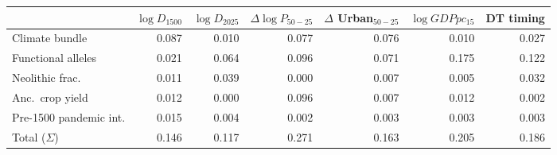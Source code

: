 \begin{tabular}{lrrrrrr}
\toprule
 & $\log D_{1500}$ & $\log D_{2025}$ & $\Delta\log\!P_{50\!-\!25}$ & $\Delta$ Urban$_{50\!-\!25}$ & $\log\!GDPpc_{15}$ & DT timing \\
\midrule
Climate bundle & 0.087 & 0.010 & 0.077 & 0.076 & 0.010 & 0.027 \\
Functional alleles & 0.021 & 0.064 & 0.096 & 0.071 & 0.175 & 0.122 \\
Neolithic frac. & 0.011 & 0.039 & 0.000 & 0.007 & 0.005 & 0.032 \\
Anc.\ crop yield & 0.012 & 0.000 & 0.096 & 0.007 & 0.012 & 0.002 \\
Pre-1500 pandemic int. & 0.015 & 0.004 & 0.002 & 0.003 & 0.003 & 0.003 \\
\midrule
Total ($\Sigma$) & 0.146 & 0.117 & 0.271 & 0.163 & 0.205 & 0.186 \\
\bottomrule
\end{tabular}
